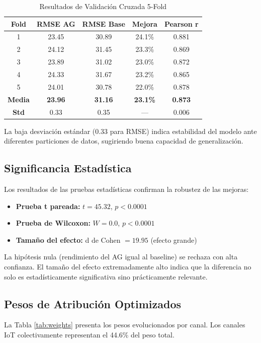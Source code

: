 \documentclass[conference]{IEEEtran}
\begin{document}
\begin{table}[htbp]
\caption{Resultados de Validación Cruzada 5-Fold}
\begin{center}
\begin{tabular}{ccccc}
\toprule
\textbf{Fold} & \textbf{RMSE AG} & \textbf{RMSE Base} & \textbf{Mejora} & \textbf{Pearson r} \\
\midrule
1 & 23.45 & 30.89 & 24.1\% & 0.881 \\
2 & 24.12 & 31.45 & 23.3\% & 0.869 \\
3 & 23.89 & 31.02 & 23.0\% & 0.872 \\
4 & 24.33 & 31.67 & 23.2\% & 0.865 \\
5 & 24.01 & 30.78 & 22.0\% & 0.878 \\
\midrule
\textbf{Media} & \textbf{23.96} & \textbf{31.16} & \textbf{23.1\%} & \textbf{0.873} \\
\textbf{Std} & 0.33 & 0.35 & — & 0.006 \\
\bottomrule
\end{tabular}
\label{tab:cv}
\end{center}
\end{table}

La baja desviación estándar (0.33 para RMSE) indica estabilidad del modelo ante diferentes particiones de datos, sugiriendo buena capacidad de generalización.

\subsection{Significancia Estadística}
Los resultados de las pruebas estadísticas confirman la robustez de las mejoras:
\begin{itemize}
    \item \textbf{Prueba t pareada:} $t = 45.32$, $p < 0.0001$
    \item \textbf{Prueba de Wilcoxon:} $W = 0.0$, $p < 0.0001$
    \item \textbf{Tamaño del efecto:} d de Cohen $= 19.95$ (efecto grande)
\end{itemize}

La hipótesis nula (rendimiento del AG igual al baseline) se rechaza con alta confianza. El tamaño del efecto extremadamente alto indica que la diferencia no solo es estadísticamente significativa sino prácticamente relevante.

\subsection{Pesos de Atribución Optimizados}
La Tabla \ref{tab:weights} presenta los pesos evolucionados por canal. Los canales IoT colectivamente representan el 44.6\% del peso total.
\end{document}

